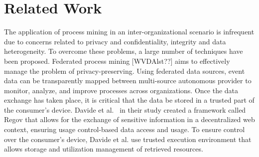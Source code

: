 \section{Related Work}
The application of process mining in an inter-organizational scenario is infrequent due to concerns related to privacy and confidentiality, integrity and data heterogeneity. To overcome these problems, a large number of techniques have been proposed. Federated process mining [WVDAlst??] aims to effectively manage the problem of privacy-preserving. Using federated data sources, event data can be transparently mapped between multi-source autonomous provider to monitor, analyze, and improve processes across organizations.
Once the data exchange has taken place, it is critical that the data be stored in a trusted part of the consumer's device. Davide et al.~\cite{Basile_Blockchain_based_resource_governance_for_decentralized_web_environments} in their study created a framework called Regov that allows for the exchange of sensitive information in a decentralized web context, ensuring usage control-based data access and usage. To ensure control over the consumer's device, Davide et al. use trusted execution environment that allows storage and utilization management of retrieved resources. 

\label{sec:background}